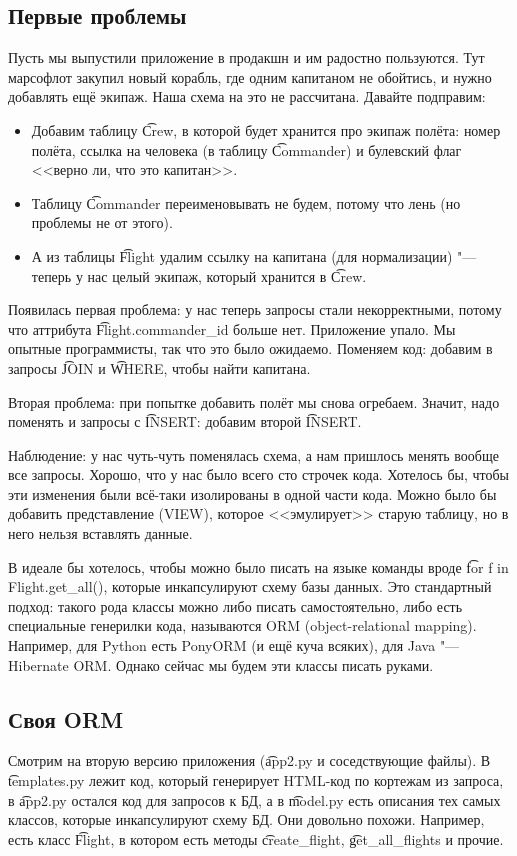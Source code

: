\subsection{Первые проблемы}
	Пусть мы выпустили приложение в продакшн и им радостно пользуются.
	Тут марсофлот закупил новый корабль, где одним капитаном не обойтись, и нужно добавлять ещё экипаж.
	Наша схема на это не рассчитана.
	Давайте подправим:
	\begin{itemize}
		\item
			Добавим таблицу \t{Crew}, в которой будет хранится про экипаж
			полёта: номер полёта, ссылка на человека (в таблицу \t{Commander})
			и булевский флаг <<верно ли, что это капитан>>.
		\item Таблицу \t{Commander} переименовывать не будем, потому что лень (но проблемы не от этого).
		\item
			А из таблицы \t{Flight} удалим ссылку на капитана (для нормализации) "--- теперь у
			нас целый экипаж, который хранится в \t{Crew}.
	\end{itemize}
	Появилась первая проблема: у нас теперь запросы стали некорректными, потому что аттрибута \t{Flight.commander\_id} больше нет.
	Приложение упало.
	Мы опытные программисты, так что это было ожидаемо.
	Поменяем код: добавим в запросы \t{JOIN} и \t{WHERE}, чтобы найти капитана.

	Вторая проблема: при попытке добавить полёт мы снова огребаем.
	Значит, надо поменять и запросы с \t{INSERT}: добавим второй \t{INSERT}.

	Наблюдение: у нас чуть-чуть поменялась схема, а нам пришлось менять вообще все запросы.
	Хорошо, что у нас было всего сто строчек кода.
	Хотелось бы, чтобы эти изменения были всё-таки изолированы в одной части кода.
	Можно было бы добавить представление (VIEW), которое <<эмулирует>> старую таблицу,
	но в него нельзя вставлять данные.

	В идеале бы хотелось, чтобы можно было писать на языке команды вроде \t{for f in Flight.get\_all()},
	которые инкапсулируют схему базы данных.
	Это стандартный подход: такого рода классы можно либо писать самостоятельно, либо
	есть специальные генерилки кода, называются ORM (object-relational mapping).
	Например, для Python есть PonyORM (и ещё куча всяких), для Java "--- Hibernate ORM.
	Однако сейчас мы будем эти классы писать руками.

\subsection{Своя ORM}
	Смотрим на вторую версию приложения (\t{app2.py} и соседствующие файлы).
	В \t{templates.py} лежит код, который генерирует HTML-код по кортежам из запроса,
	в \t{app2.py} остался код для запросов к БД, а в \t{model.py} есть описания тех
	самых классов, которые инкапсулируют схему БД.
	Они довольно похожи.
	Например, есть класс \t{Flight}, в котором есть методы \t{create\_flight}, \t{get\_all\_flights} и прочие.

